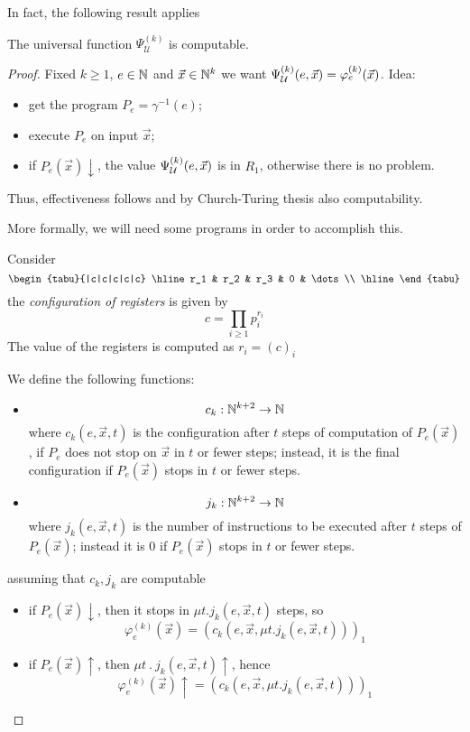 In fact, the following result applies
\begin{theorem}
  The universal function $\Psi_{\mathcal{U}}^{(k)}$
  is computable.
  \begin{proof}
    Fixed $k \geq 1$,
    $e \in \mathbb{N}$ and $\vec{x} \in \mathbb{N}^k$ we want
    $\Psi_{\mathcal{U}}^{(k)} (e, \vec{x}) = \varphi_e^{(k)}(\vec{x})$.
    Idea:
    \begin{itemize}
    \item get the program $P_e = \gamma^{-1}(e)$;
    \item execute $P_e$ on input $\vec{x}$;
    \item if $P_e(\vec{x})\downarrow$, the value $\Psi_{\mathcal{U}}^{(k)} (e, \vec{x})$ is in
      $R_1$, otherwise there is no problem.
    \end{itemize}
    Thus, effectiveness follows and by Church-Turing thesis also computability.

    More formally, we will need some programs
    in order to accomplish this.

      Consider
      \[
        \begin{tabu}{|c|c|c|c|c}
          \hline
          r_1 & r_2 & r_3 & 0 & \dots \\ \hline
        \end{tabu}
      \]
      the \textit{configuration of registers} is given by
      \[ c = \prod_{i \geq 1} p_i^{r_i} \]
      The value of the registers is computed as $ r_i = (c)_i$

    We define the following functions:
    \begin{itemize}
      \item \[
        c_k : \mathbb{N}^{k+2} \rightarrow \mathbb{N}
      \]
      where 
      $c_k(e, \vec{x}, t)$
      is the configuration after $t$ steps of computation of $P_e(\vec{x})$,
      if $P_e$ does not stop on $\vec{x}$ in $t$ or fewer steps; instead, it is
      the final configuration if $P_e(\vec{x})$ stops in $t$ or fewer steps.
      \item  \[
        j_k : \mathbb{N}^{k+2} \rightarrow \mathbb{N}
      \]
      where
      $j_k(e, \vec{x}, t)$ is the number of instructions to be executed after $t$
      steps of $P_e(\vec{x})$; instead it is $0$ if $P_e(\vec{x})$ stops in $t$ or fewer steps.
    \end{itemize}
    assuming that $c_k, j_k$ are computable
    \begin{itemize}
      \item if $P_e(\vec{x}) \downarrow$, then it stops in $\mu t . j_k(e, \vec{x}, t)$ steps, so
            \[\varphi_e^{(k)}(\vec{x}) = (c_k(e,\vec{x}, \mu t . j_k(e, \vec{x}, t)))_1\]
      \item if $P_e(\vec{x}) \uparrow$, then $\mu t \ . \ j_k(e, \vec{x}, t) \uparrow$, hence
            \[\varphi_e^{(k)}(\vec{x}) \uparrow = (c_k(e,\vec{x}, \mu t . j_k(e, \vec{x}, t)))_1\]
    \end{itemize}
   

\end{proof}
\end{theorem}

